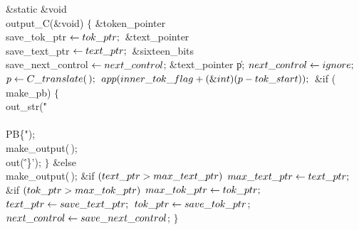 \Y\B\1\1\&{static} \&{void} \\{output\_C}(\&{void})\2\2\6
${}\{{}$\1\6
\&{token\_pointer} \\{save\_tok\_ptr}${}\leftarrow\\{tok\_ptr};{}$\6
\&{text\_pointer} \\{save\_text\_ptr}${}\leftarrow\\{text\_ptr};{}$\6
\&{sixteen\_bits} \\{save\_next\_control}${}\leftarrow\\{next\_control}{}$;\6
\&{text\_pointer} \|p;\7
${}\\{next\_control}\leftarrow\\{ignore};{}$\6
${}\|p\K\\{C\_translate}(\,);{}$\6
${}\\{app}(\\{inner\_tok\_flag}+(\&{int})(\|p-\\{tok\_start}));{}$\6
\&{if} (\\{make\_pb})\5
${}\{{}$\1\6
\\{out\_str}(\.{"\\\\PB\{"});\6
\\{make\_output}(\,);\6
\\{out}(\.{'\}'});\6
\4${}\}{}$\5
\2\&{else}\1\5
\\{make\_output}(\,);\2\6
\&{if} ${}(\\{text\_ptr}>\\{max\_text\_ptr}){}$\1\5
${}\\{max\_text\_ptr}\leftarrow\\{text\_ptr};{}$\2\6
\&{if} ${}(\\{tok\_ptr}>\\{max\_tok\_ptr}){}$\1\5
${}\\{max\_tok\_ptr}\leftarrow\\{tok\_ptr};{}$\2\6
${}\\{text\_ptr}\leftarrow\\{save\_text\_ptr};{}$\6
${}\\{tok\_ptr}\leftarrow\\{save\_tok\_ptr}{}$;\6
${}\\{next\_control}\leftarrow\\{save\_next\_control}{}$;\6
\4${}\}{}$\2\par
\fi

